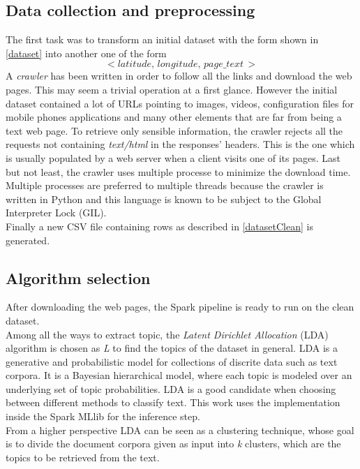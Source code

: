 \documentclass{sig-alternate-05-2015}
\begin{document}
\subsection{Data collection and preprocessing}\label{preprocessing}
The first task was to transform an initial dataset with the form shown in \ref{dataset} into another one of the form
\begin{equation}\label{datasetClean}
    <latitude,\,longitude,\,page\_text\,>
\end{equation}
A \emph{crawler} has been written in order to follow all the links and download the web pages. This may seem a trivial operation at a first glance. However the initial dataset contained a lot of URLs pointing to images, videos, configuration files for mobile phones applications and many other elements that are far from being a text web page. To retrieve only sensible information, the crawler rejects all the requests not containing \emph{text/html} in the responses' headers. This is the one which is usually populated by a web server when a client visits one of its pages. Last but not least, the crawler uses multiple processe to minimize the download time. Multiple processes are preferred to multiple threads because the crawler is written in Python and this language is known to be subject to the Global Interpreter Lock\cite{gil} (GIL).\\
Finally a new CSV file containing rows as described in \ref{datasetClean} is generated.
\subsection{Algorithm selection}\label{algorithmSelection}
After downloading the web pages, the Spark pipeline is ready to run on the clean dataset.\\
Among all the ways to extract topic, the \emph{Latent Dirichlet Allocation}\cite{lda} (LDA) algorithm is chosen as \emph{L} to find the topics of the dataset in general. LDA is a generative and probabilistic model for collections of discrite data such as text corpora. It is a Bayesian hierarchical model, where each topic is modeled over an underlying set of topic probabilities. LDA is a good candidate when choosing between different methods to classify text. This work uses the implementation inside the Spark MLlib for the inference step.\\
From a higher perspective LDA can be seen as a clustering technique, whose goal is to divide the document corpora given as input into \emph{k} clusters, which are the topics to be retrieved from the text.
\end{document}

